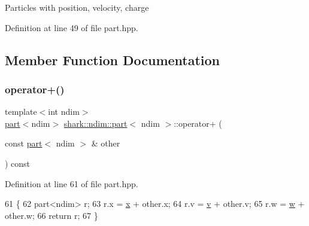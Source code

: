 Particles with position, velocity, charge 

Definition at line 49 of file part.\+hpp.



\subsection{Member Function Documentation}
\hypertarget{structshark_1_1ndim_1_1part_af38c76aff059b4468d7cc3d049f52547}{}\label{structshark_1_1ndim_1_1part_af38c76aff059b4468d7cc3d049f52547} 
\subsubsection{\texorpdfstring{operator+()}{operator+()}}
{\footnotesize\ttfamily template$<$int ndim$>$ \\
\hyperlink{structshark_1_1ndim_1_1part}{part}$<$ndim$>$ \hyperlink{structshark_1_1ndim_1_1part}{shark\+::ndim\+::part}$<$ ndim $>$\+::operator+ (\begin{DoxyParamCaption}\item[{const \hyperlink{structshark_1_1ndim_1_1part}{part}$<$ ndim $>$ \&}]{other }\end{DoxyParamCaption}) const\hspace{0.3cm}{\ttfamily [inline]}}



Definition at line 61 of file part.\+hpp.


\begin{DoxyCode}
61                                                                                    \{
62                                 part<ndim> r;
63                                 r.x = \hyperlink{structshark_1_1ndim_1_1part_a8683feb6fd18c499f11f72dcdd3b7c1a}{x} + other.x;
64                                 r.v = \hyperlink{structshark_1_1ndim_1_1part_a985d6b06c78b3d33e080d2610ca4e3da}{v} + other.v;
65                                 r.w = \hyperlink{structshark_1_1ndim_1_1part_a030c3103f8272c8119666a818b99c513}{w} + other.w;
66                                 \textcolor{keywordflow}{return} r;
67                         \}
\end{DoxyCode}
\hypertarget{structshark_1_1ndim_1_1part_a94f82c7e9b155ada9b231f8bb4ed7d6f}{}\label{structshark_1_1ndim_1_1part_a94f82c7e9b155ada9b231f8bb4ed7d6f} 
